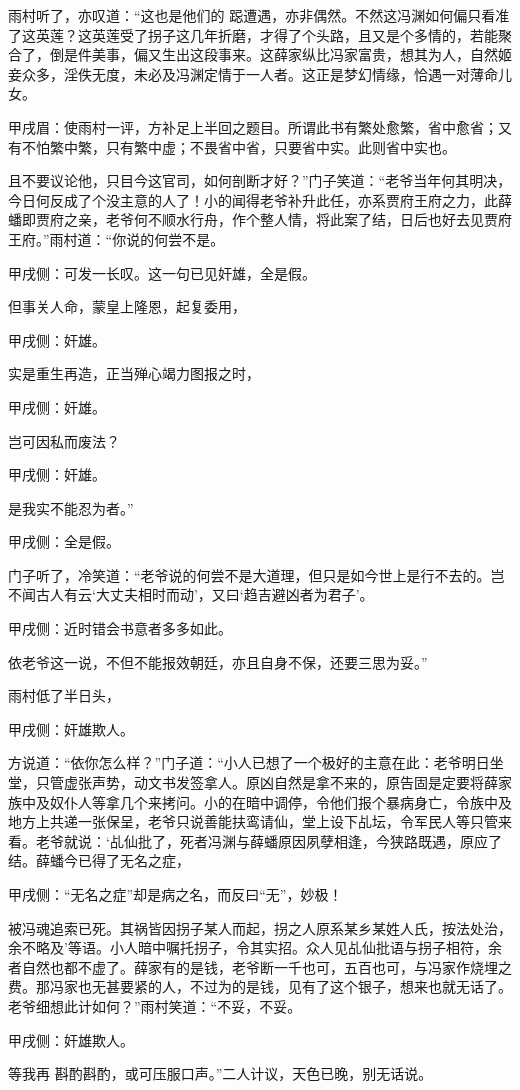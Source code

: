 \begin{parag}
    雨村听了，亦叹道：“这也是他们的 跽遭遇，亦非偶然。不然这冯渊如何偏只看准了这英莲？这英莲受了拐子这几年折磨，才得了个头路，且又是个多情的，若能聚合了，倒是件美事，偏又生出这段事来。这薛家纵比冯家富贵，想其为人，自然姬妾众多，淫佚无度，未必及冯渊定情于一人者。这正是梦幻情缘，恰遇一对薄命儿女。\begin{note}甲戌眉：使雨村一评，方补足上半回之题目。所谓此书有繁处愈繁，省中愈省；又有不怕繁中繁，只有繁中虚；不畏省中省，只要省中实。此则省中实也。\end{note}且不要议论他，只目今这官司，如何剖断才好？”门子笑道：“老爷当年何其明决，今日何反成了个没主意的人了！小的闻得老爷补升此任，亦系贾府王府之力，此薛蟠即贾府之亲，老爷何不顺水行舟，作个整人情，将此案了结，日后也好去见贾府王府。”雨村道：“你说的何尝不是。\begin{note}甲戌侧：可发一长叹。这一句已见奸雄，全是假。\end{note}但事关人命，蒙皇上隆恩，起复委用，\begin{note}甲戌侧：奸雄。\end{note}实是重生再造，正当殚心竭力图报之时，\begin{note}甲戌侧：奸雄。\end{note}岂可因私而废法？\begin{note}甲戌侧：奸雄。\end{note}是我实不能忍为者。”\begin{note}甲戌侧：全是假。\end{note}门子听了，冷笑道：“老爷说的何尝不是大道理，但只是如今世上是行不去的。岂不闻古人有云‘大丈夫相时而动’，又曰‘趋吉避凶者为君子’。\begin{note}甲戌侧：近时错会书意者多多如此。\end{note}依老爷这一说，不但不能报效朝廷，亦且自身不保，还要三思为妥。”
\end{parag}


\begin{parag}
    雨村低了半日头，\begin{note}甲戌侧：奸雄欺人。\end{note}方说道：“依你怎么样？”门子道：“小人已想了一个极好的主意在此：老爷明日坐堂，只管虚张声势，动文书发签拿人。原凶自然是拿不来的，原告固是定要将薛家族中及奴仆人等拿几个来拷问。小的在暗中调停，令他们报个暴病身亡，令族中及地方上共递一张保呈，老爷只说善能扶鸾请仙，堂上设下乩坛，令军民人等只管来看。老爷就说：‘乩仙批了，死者冯渊与薛蟠原因夙孽相逢，今狭路既遇，原应了结。薛蟠今已得了无名之症，\begin{note}甲戌侧：“无名之症”却是病之名，而反曰“无”，妙极！\end{note}被冯魂追索已死。其祸皆因拐子某人而起，拐之人原系某乡某姓人氏，按法处治，余不略及’等语。小人暗中嘱托拐子，令其实招。众人见乩仙批语与拐子相符，余者自然也都不虚了。薛家有的是钱，老爷断一千也可，五百也可，与冯家作烧埋之费。那冯家也无甚要紧的人，不过为的是钱，见有了这个银子，想来也就无话了。老爷细想此计如何？”雨村笑道：“不妥，不妥。\begin{note}甲戌侧：奸雄欺人。\end{note}等我再 斟酌斟酌，或可压服口声。”二人计议，天色已晚，别无话说。
\end{parag}


